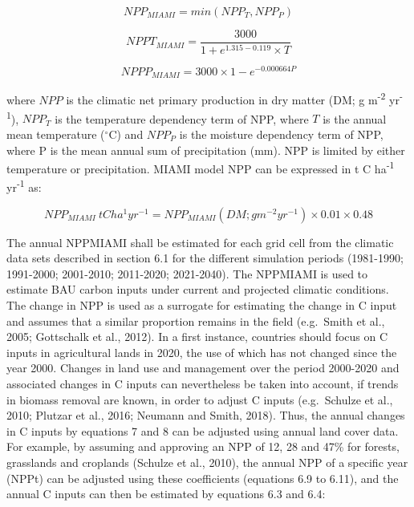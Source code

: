 \documentclass[
  10pt,
  b5paper,
]{book}
\begin{document}
\begin{equation}
\tag{6.6}
NPP_{MIAMI}= min(NPP_T , NPP_P)                                                                       
\end{equation}

\begin{equation}
\tag{6.7}
NPPT_{MIAMI}= \frac{3000}{1 + e^{1.315-0.119} \times T}  
\end{equation}

\begin{equation}
\tag{6.8}
NPPP_{MIAMI} = 3000 \times 1 - e^{-0.000664P} 
\end{equation}

where \(NPP\) is the climatic net primary production in dry matter (DM; g m\textsuperscript{-2} yr\textsuperscript{-1}), \(NPP_T\) is the temperature dependency term of NPP, where \(T\) is the annual mean temperature (\(^\circ\)C) and \(NPP_P\) is the moisture dependency term of NPP, where P is the mean annual sum of precipitation (mm). NPP is limited by either temperature or precipitation. MIAMI model NPP can be expressed in t C ha\textsuperscript{-1} yr\textsuperscript{-1} as:

\begin{equation}
\tag{6.9}
NPP_{MIAMI} \ tC ha^1 yr^{-1} = NPP_{MIAMI} (DM; g m^{-2} yr^{-1}) \times 0.01 \times 0.48                  
\end{equation}

The annual NPPMIAMI shall be estimated for each grid cell from the climatic data sets described in section 6.1 for the different simulation periods (1981-1990; 1991-2000; 2001-2010; 2011-2020; 2021-2040). The NPPMIAMI is used to estimate BAU carbon inputs under current and projected climatic conditions.
The change in NPP is used as a surrogate for estimating the change in C input and assumes that a similar proportion remains in the field (e.g.~Smith et al., 2005; Gottschalk et al., 2012). In a first instance, countries should focus on C inputs in agricultural lands in 2020, the use of which has not changed since the year 2000. Changes in land use and management over the period 2000-2020 and associated changes in C inputs can nevertheless be taken into account, if trends in biomass removal are known, in order to adjust C inputs (e.g.~Schulze et al., 2010; Plutzar et al., 2016; Neumann and Smith, 2018). Thus, the annual changes in C inputs by equations 7 and 8 can be adjusted using annual land cover data. For example, by assuming and approving an NPP of 12, 28 and 47\% for forests, grasslands and croplands (Schulze et al., 2010), the annual NPP of a specific year (NPPt) can be adjusted using these coefficients (equations 6.9 to 6.11), and the annual C inputs can then be estimated by equations 6.3 and 6.4:
\end{document}
